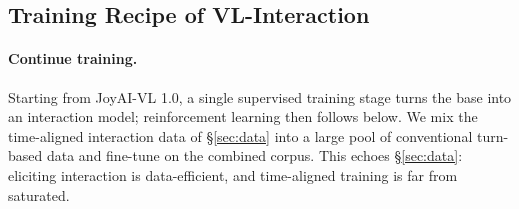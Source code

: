 \documentclass{llmxive}
\begin{document}




\subsection{Training Recipe of VL-Interaction}
\label{sec:recipe}

\paragraph{\textbf{Continue training.}}
Starting from JoyAI-VL 1.0, a single supervised training stage turns the base into an interaction model; reinforcement learning then follows below. We mix the time-aligned interaction data of \S\ref{sec:data} into a large pool of conventional turn-based data and fine-tune on the combined corpus. 
This echoes \S\ref{sec:data}: eliciting interaction is data-efficient, and time-aligned training is far from saturated.
\end{document}
